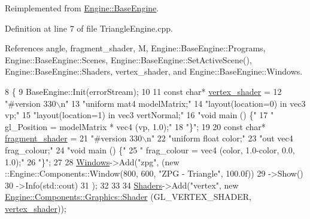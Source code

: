 Reimplemented from \mbox{\hyperlink{classEngine_1_1BaseEngine_ad9c141fe48c8c91e14e77ed5fcb90196}{Engine\+::\+Base\+Engine}}.



Definition at line 7 of file Triangle\+Engine.\+cpp.



References angle, fragment\+\_\+shader, M, Engine\+::\+Base\+Engine\+::\+Programs, Engine\+::\+Base\+Engine\+::\+Scenes, Engine\+::\+Base\+Engine\+::\+Set\+Active\+Scene(), Engine\+::\+Base\+Engine\+::\+Shaders, vertex\+\_\+shader, and Engine\+::\+Base\+Engine\+::\+Windows.


\begin{DoxyCode}
8 \{
9     BaseEngine::Init(errorStream);
10 
11     \textcolor{keyword}{const} \textcolor{keywordtype}{char}* \mbox{\hyperlink{ZPGEngine_8cpp_afc33b8912f9f93d1d2544df04ad4a81a}{vertex\_shader}} =
12         \textcolor{stringliteral}{"#version 330\(\backslash\)n"}
13         \textcolor{stringliteral}{"uniform mat4 modelMatrix;"}
14         \textcolor{stringliteral}{"layout(location=0) in vec3 vp;"}
15         \textcolor{stringliteral}{"layout(location=1) in vec3 vertNormal;"}
16         \textcolor{stringliteral}{"void main () \{"}
17         \textcolor{stringliteral}{" gl\_Position = modelMatrix * vec4 (vp, 1.0);"}
18         \textcolor{stringliteral}{"\}"};
19 
20     \textcolor{keyword}{const} \textcolor{keywordtype}{char}*  \mbox{\hyperlink{ZPGEngine_8cpp_ab187f2ba2a2f72ea5571921a1a856582}{fragment\_shader}} =
21         \textcolor{stringliteral}{"#version 330\(\backslash\)n"}
22         \textcolor{stringliteral}{"uniform float color;"}
23         \textcolor{stringliteral}{"out vec4 frag\_colour;"}
24         \textcolor{stringliteral}{"void main () \{"}
25         \textcolor{stringliteral}{"     frag\_colour = vec4 (color, 1.0-color, 0.0, 1.0);"}
26         \textcolor{stringliteral}{"\}"};
27 
28     \mbox{\hyperlink{classEngine_1_1BaseEngine_a4a1a4c4dae052e66ecc4f326eeed4d33}{Windows}}->Add(\textcolor{stringliteral}{"zpg"}, (new ::Engine::Components::Window(800, 600, \textcolor{stringliteral}{"ZPG - Triangle"}, 100.0f))
29         ->Show()
30         ->Info(std::cout)
31     );
32 
33 
34     \mbox{\hyperlink{classEngine_1_1BaseEngine_a2582dee3f73da82bb422b43317b85e3b}{Shaders}}->Add(\textcolor{stringliteral}{"vertex"}, \textcolor{keyword}{new} \mbox{\hyperlink{classEngine_1_1Components_1_1Graphics_1_1Shader}{Engine::Components::Graphics::Shader}}
      (GL\_VERTEX\_SHADER, \mbox{\hyperlink{ZPGEngine_8cpp_afc33b8912f9f93d1d2544df04ad4a81a}{vertex\_shader}}));

\end{DoxyCode}
